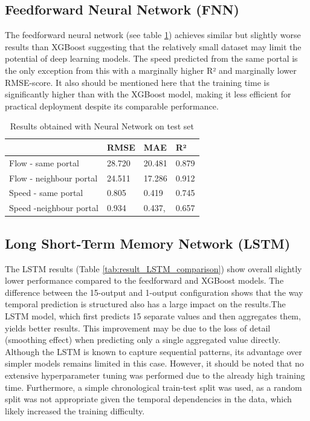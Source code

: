 	\subsection{Feedforward Neural Network (FNN)}
	The feedforward neural network (see table \ref{tab:result_NN}) achieves similar but slightly worse results than XGBoost suggesting that the relatively small dataset may limit the potential of deep learning models. The speed predicted from the same portal is the only exception from this with a marginally higher R² and marginally lower RMSE-score. 
	It also should be mentioned here that the training time is significantly higher than with the XGBoost model, making it less efficient for practical deployment despite its comparable performance.
	\begin{table}[H]
		\centering
		\caption{Results obtained with Neural Network on test set}
		\label{tab:result_NN}
		\begin{tabular}{l|lll}
			& RMSE   & MAE    & R²    \\
			\hline
			Flow - same portal      &28.720& 20.481 & 0.879 \\
			Flow - neighbour portal &  24.511 & 17.286 &0.912 \\
			Speed - same portal     & 0.805 & 0.419& 0.745 \\
			Speed -neighbour portal & 0.934 & 0.437, & 0.657
		\end{tabular}
	\end{table}
	\subsection{Long Short-Term Memory Network (LSTM)}
	The LSTM results (Table \ref{tab:result_LSTM_comparison}) show overall slightly lower performance compared to the feedforward and XGBoost models.
	The difference between the 15-output and 1-output configuration shows that the way temporal prediction is structured also has a large impact on the results.The LSTM model, which first predicts 15 separate values and then aggregates them, yields better results. This improvement may be due to the loss of detail (smoothing effect) when predicting only a single aggregated value directly.
	Although the LSTM is known to capture sequential patterns, its advantage over simpler models remains limited in this case. However, it should be noted that no extensive hyperparameter tuning was performed due to the already high training time. Furthermore, a simple chronological train-test split was used, as a random split was not appropriate given the temporal dependencies in the data, which likely increased the training difficulty.
	
